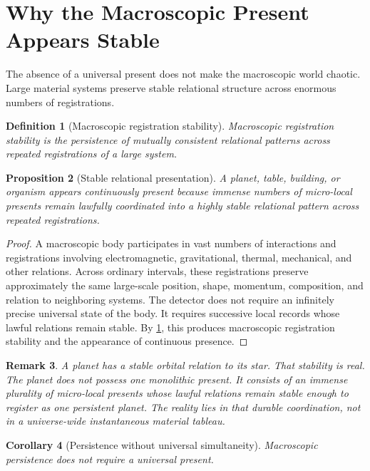 \documentclass[12pt,onecolumn]{article}
\newtheorem{proposition}{Proposition}[section]
\newtheorem{definition}[proposition]{Definition}
\newtheorem{corollary}[proposition]{Corollary}
\newtheorem{remark}[proposition]{Remark}
\begin{document}
\section{Why the Macroscopic Present Appears Stable}

The absence of a universal present does not make the macroscopic world chaotic. Large material systems preserve stable relational structure across enormous numbers of registrations.

\begin{definition}[Macroscopic registration stability]
\label{def:macro-stability}
Macroscopic registration stability is the persistence of mutually consistent relational patterns across repeated registrations of a large system.
\end{definition}

\begin{proposition}[Stable relational presentation]
\label{prop:stable-presentation}
A planet, table, building, or organism appears continuously present because immense numbers of micro-local presents remain lawfully coordinated into a highly stable relational pattern across repeated registrations.
\end{proposition}

\begin{proof}
A macroscopic body participates in vast numbers of interactions and registrations involving electromagnetic, gravitational, thermal, mechanical, and other relations. Across ordinary intervals, these registrations preserve approximately the same large-scale position, shape, momentum, composition, and relation to neighboring systems. The detector does not require an infinitely precise universal state of the body. It requires successive local records whose lawful relations remain stable. By \cref{def:macro-stability}, this produces macroscopic registration stability and the appearance of continuous presence.
\end{proof}

\begin{remark}
A planet has a stable orbital relation to its star. That stability is real. The planet does not possess one monolithic present. It consists of an immense plurality of micro-local presents whose lawful relations remain stable enough to register as one persistent planet. The reality lies in that durable coordination, not in a universe-wide instantaneous material tableau.
\end{remark}

\begin{corollary}[Persistence without universal simultaneity]
\label{cor:persistence}
Macroscopic persistence does not require a universal present.
\end{corollary}
\end{document}
